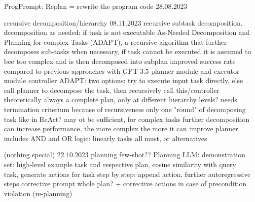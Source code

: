 \documentclass{article}
\begin{document}
ProgPrompt: Replan = rewrite the program code \cite{singh_progprompt_2023} 28.08.2023

recursive decomposition/hierarchy
\cite{prasad_adapt_2023} 08.11.2023 recursive subtask decomposition. decomposition as needed: if task is not executable
As-Needed Decomposition and Planning for complex Tasks (ADAPT), a recursive algorithm that further decomposes sub-tasks when necessary,
if task cannot be executed it is assumed to bee too complex and is then decomposed into subplan
improved success rate compared to previous approaches with GPT-3.5
planner module and executor module
controller ADAPT:
two options: try to execute input task directly, else call planner to decompose the task, 
then recursively call this/controller
theoretically always a complete plan, only at different hierarchy levels?
needs termination criterium because of recursiveness 
only one "round" of decomposing task like in ReAct? may ot be sufficient, for complex tasks further decomposition can increase performance, the more complex the more it can improve
planner includes AND and OR logic: linearly tasks all must, or alternatives

(nothing special)
\cite{raman_cape_2023} 22.10.2023 planning few-shot??
Planning LLM: demonstration set: high-level example task and respective plan, cosine similarity with query task, generate actions for task
step by step: append action, further autoregressive steps
corrective prompt 
whole plan? + corrective actions in case of precondition violation (re-planning)
\end{document}
